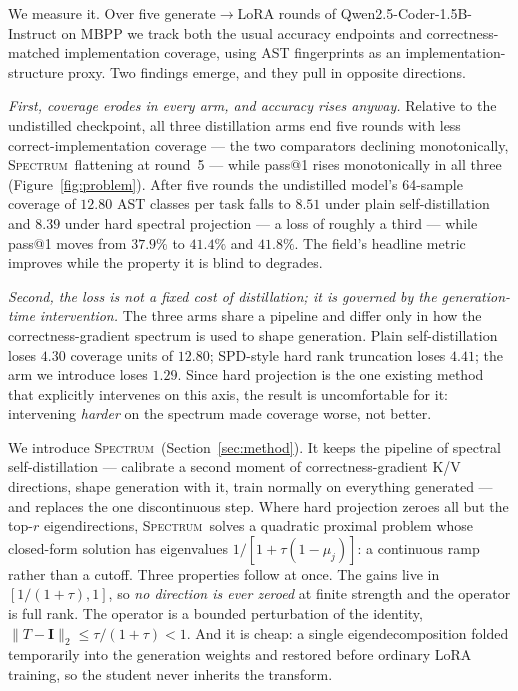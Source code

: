 \documentclass{article}
\newcommand{\method}{\textsc{Spectrum}}
\newcommand{\I}{\mathbf{I}}
\begin{document}
We measure it. Over five generate$\to$LoRA rounds of Qwen2.5-Coder-1.5B-Instruct on MBPP we track both the usual accuracy endpoints and correctness-matched implementation coverage, using AST fingerprints as an implementation-structure proxy. Two findings emerge, and they pull in opposite directions.

\emph{First, coverage erodes in every arm, and accuracy rises anyway.} Relative to the undistilled checkpoint, all three distillation arms end five rounds with less correct-implementation coverage --- the two comparators declining monotonically, \method\ flattening at round~5 --- while pass@1 rises monotonically in all three (Figure~\ref{fig:problem}). After five rounds the undistilled model's 64-sample coverage of $12.80$ AST classes per task falls to $8.51$ under plain self-distillation and $8.39$ under hard spectral projection --- a loss of roughly a third --- while pass@1 moves from $37.9\%$ to $41.4\%$ and $41.8\%$. The field's headline metric improves while the property it is blind to degrades.

\emph{Second, the loss is not a fixed cost of distillation; it is governed by the generation-time intervention.} The three arms share a pipeline and differ only in how the correctness-gradient spectrum is used to shape generation. Plain self-distillation loses $4.30$ coverage units of $12.80$; SPD-style hard rank truncation loses $4.41$; the arm we introduce loses $1.29$. Since hard projection is the one existing method that explicitly intervenes on this axis, the result is uncomfortable for it: intervening \emph{harder} on the spectrum made coverage worse, not better.

We introduce \method\ (Section~\ref{sec:method}). It keeps the pipeline of spectral self-distillation --- calibrate a second moment of correctness-gradient K/V directions, shape generation with it, train normally on everything generated --- and replaces the one discontinuous step. Where hard projection zeroes all but the top-$r$ eigendirections, \method\ solves a quadratic proximal problem whose closed-form solution has eigenvalues $1/[1+\tau(1-\mu_j)]$: a continuous ramp rather than a cutoff. Three properties follow at once. The gains live in $[1/(1+\tau),1]$, so \emph{no direction is ever zeroed} at finite strength and the operator is full rank. The operator is a bounded perturbation of the identity, $\|T-\I\|_2 \le \tau/(1+\tau) < 1$. And it is cheap: a single eigendecomposition folded temporarily into the generation weights and restored before ordinary LoRA training, so the student never inherits the transform.
\end{document}
